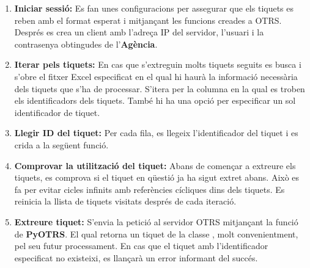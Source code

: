 \begin{enumerate}
     \item \textbf{Iniciar sessió:} Es fan unes configuracions per assegurar que els tiquets es reben amb el format esperat i mitjançant les funcions creades a OTRS. Després es crea un client amb l'adreça IP del servidor, l'usuari i la contrasenya obtingudes de l'\textbf{Agència}.
     \item \textbf{Iterar pels tiquets:} En cas que s'extreguin molts tiquets seguits es busca i s'obre el fitxer Excel especificat en el qual hi haurà la informació necessària dels tiquets que s'ha de processar. S'itera per la columna en la qual es troben els identificadors dels tiquets. També hi ha una opció per especificar un sol identificador de tiquet.
     \item \textbf{Llegir ID del tiquet:} Per cada fila, es llegeix l'identificador del tiquet i es crida a la següent funció.
     \item \textbf{Comprovar la utilització del tiquet:} Abans de començar a extreure els tiquets, es comprova si el tiquet en qüestió ja ha sigut extret abans. Això es fa per evitar cicles infinits amb referències cícliques dins dels tiquets. Es reinicia la llista de tiquets visitats després de cada iteració.
     \item \textbf{Extreure tiquet:} S'envia la petició al servidor OTRS mitjançant la funció \linebreak {} de \textbf{PyOTRS}. El qual retorna un tiquet de la classe , molt convenientment, pel seu futur processament. En cas que el tiquet amb l'identificador especificat no existeixi, es llançarà un error informant del succés.
\end{enumerate}


